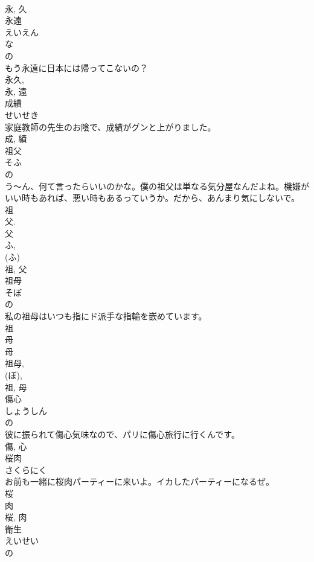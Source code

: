 \documentclass[8pt]{extreport}
\begin{document}
\begin{CJK}{UTF8}{min}
\\	永, 久	
\\	永遠	
\\	えいえん	
\\	な 
\\	の 
\\	もう永遠に日本には帰ってこないの？	
\\	永久, 
\\	永, 遠	
\\	成績	
\\	せいせき	
\\	家庭教師の先生のお陰で、成績がグンと上がりました。	
\\	成, 績	
\\	祖父	
\\	そふ	
\\	の 
\\	う〜ん、何て言ったらいいのかな。僕の祖父は単なる気分屋なんだよね。機嫌がいい時もあれば、悪い時もあるっていうか。だから、あんまり気にしないで。	
\\	祖 
\\	父. 
\\	父 
\\	ふ, 
\\	(ふ) 
\\	祖, 父	
\\	祖母	
\\	そぼ	
\\	の 
\\	私の祖母はいつも指にド派手な指輪を嵌めています。	
\\	祖 
\\	母 
\\	母 
\\	祖母, 
\\	(ぼ), 
\\	祖, 母	
\\	傷心	
\\	しょうしん	
\\	の 
\\	彼に振られて傷心気味なので、パリに傷心旅行に行くんです。	
\\	傷, 心	
\\	桜肉	
\\	さくらにく	
\\	お前も一緒に桜肉パーティーに来いよ。イカしたパーティーになるぜ。	
\\	桜 
\\	肉 
\\	桜, 肉	
\\	衛生	
\\	えいせい	
\\	の 

\end{CJK}
\end{document}
